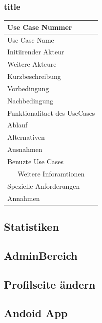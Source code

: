 \documentclass[10pt,a4paper]{article}
\begin{document}
	\subsubsection{title}
		\begin{tabular}{|l|p{.5\linewidth}|}
		\hline Use Case Nummer &  \\ 
		\hline Use Case Name &  \\ 
		\hline Initiirender Akteur &  \\
		\hline Weitere Akteure &  \\
		\hline Kurzbeschreibung &  \\
		\hline Vorbedingung &  \\
		\hline Nachbedingung &  \\
		\hline \multicolumn{2}{|c|}{Funktionalitaet des UseCases}\\
		\hline Ablauf &  \\
		\hline Alternativen &  \\
		\hline Ausnahmen &  \\
		\hline Benuzte Use Cases &  \\
		\hline \multicolumn{2}{|c|}{Weitere Inforamtionen} \\
		\hline Spezielle Anforderungen &  \\
		\hline Annahmen &  \\
		\hline
		\end{tabular}
\subsection{Statistiken}
\subsection{AdminBereich}
\subsection{Profilseite \"andern}

\subsection{Andoid App}


\end{document}
